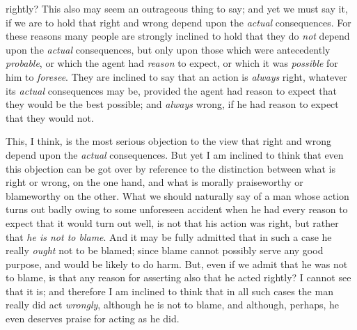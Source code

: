 rightly? This also  may seem an outrageous thing to say;
and yet we must say it, if we are to hold that right and wrong depend
upon the \textit{actual} consequences. For these reasons many people
are strongly inclined to hold that they do \textit{not} depend upon
the \textit{actual} consequences, but only upon those which were
antecedently \textit{probable}, or which the agent had \textit{reason}
to expect, or which it was \textit{possible} for him to
\textit{foresee}. They are inclined to say that an action is
\textit{always} right, whatever its \textit{actual} consequences may
be, provided the agent had reason to expect that they would be the
best possible; and \textit{always} wrong, if he had reason to expect
that they would not.

This, I think, is the most serious objection to the view that right
and wrong depend upon the \textit{actual} consequences. But yet I am
inclined to think that even this objection can be got over by
reference to the distinction between what is right or wrong, on the
one hand, and what is morally praiseworthy or blameworthy on the
other. What we should naturally say of a man whose action turns out
badly owing to some unforeseen accident when he had every reason to
expect that it  would turn out well, is not that his action
was right, but rather that \textit{he is not to blame}. And it may be
fully admitted that in such a case he really \textit{ought} not to be
blamed; since blame cannot possibly serve any good purpose, and would
be likely to do harm. But, even if we admit that he was not to blame,
is that any reason for asserting also that he acted rightly? I cannot
see that it is; and therefore I am inclined to think that in all such
cases the man really did act \textit{wrongly}, although he is not to
blame, and although, perhaps, he even deserves praise for acting as he
did.

